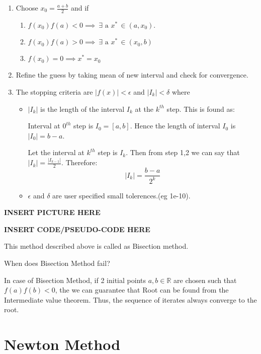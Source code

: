 \documentclass[
]{book}
\begin{document}
\begin{enumerate}
\def\labelenumi{\arabic{enumi}.}
\item
  Choose \(x_0 = \frac{a+b}{2}\) and if

  \begin{enumerate}
  \def\labelenumii{\alph{enumii}.}
  \item
    \(f(x_0) f(a)<0 \implies \ \exists \text{ a } x^*\, \in (a,x_0)\).
  \item
    \(f(x_0) f(a)>0 \implies \ \exists \text{ a } x^*\, \in (x_0,b)\)
  \item
    \(f(x_0) =0 \implies x^* = x_0\)
  \end{enumerate}
\item
  Refine the guess by taking mean of new interval and check for convergence.
\item
  The stopping criteria are \(|f(x)|<\epsilon\) and \(|I_k|<\delta\) where

  \begin{itemize}
  \item
    \(|I_k|\) is the length of the interval \(I_k\) at the \(k^{th}\) step. This is found as:

    Interval at \(0^{th}\) step is \(I_0 = [a,b]\). Hence the length of interval \(I_0\) is \(|I_0|= b-a\).

    Let the interval at \(k^{th}\) step is \(I_k\). Then from step 1,2 we can say that \(|I_k| = \frac{|I_{k-1}|}{2}\). Therefore: \[|I_k| = \frac{b-a}{2^k}\]
  \item
    \(\epsilon\) and \(\delta\) are user specified small tolerences.(eg 1e-10).
  \end{itemize}
\end{enumerate}

\textbf{INSERT PICTURE HERE}

\textbf{INSERT CODE/PSEUDO-CODE HERE}

This method described above is called as Bisection method.

When does Bisection Method fail?

In case of Bisection Method, if 2 initial points \(a,b \in \mathbb{R}\) are chosen such that \(f(a)f(b)<0\), the we can guarantee that Root can be found from the Intermediate value theorem. Thus, the sequence of iterates always converge to the root.

\hypertarget{newton-method}{%
\section{Newton Method}\label{newton-method}}
\end{document}
